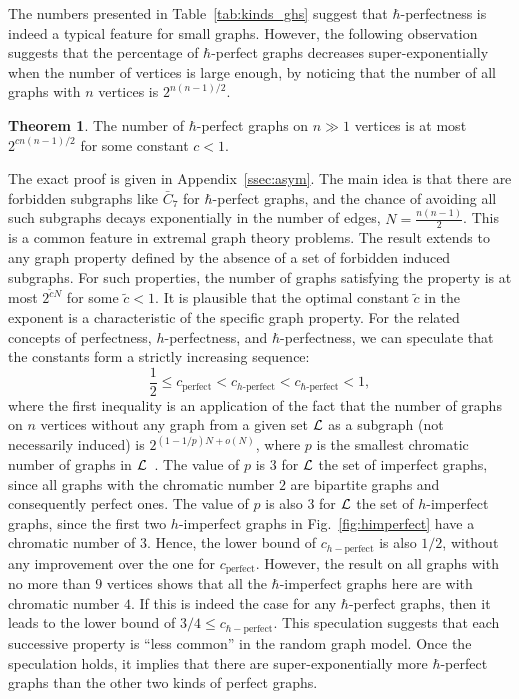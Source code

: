 \documentclass[
12pt,
prx,
aps,
reprint,
a4paper,
longbibliograph,
nofootinbib,
nobibnotes,
superscriptaddress
]{revtex4-2}
\theoremstyle{definition}
\newtheorem{theorem}{Theorem}
\begin{document}
The numbers presented in Table~\ref{tab:kinds_ghs} suggest that $\hbar$-perfectness is indeed a typical feature for small graphs. 
However, the following observation suggests that the percentage of $\hbar$-perfect graphs decreases super-exponentially when the number of vertices is large enough, by noticing that the number of all graphs with $n$ vertices is $2^{n(n-1)/2}$. 
\begin{theorem}
\label{thm:haufigkeit}
	The number of $\hbar$-perfect graphs on $n\gg 1$ vertices is at most $2^{c n(n-1)/2}$ for some constant $c<1$.
\end{theorem}
The exact proof is given in Appendix~\ref{ssec:asym}. The main idea is that there are forbidden subgraphs like $\bar{C}_7$ for $\hbar$-perfect graphs, and the chance of avoiding all such subgraphs decays exponentially in the number of edges, $N=\frac{n(n-1)}{2}$.
This is a common feature in extremal graph theory problems. 
The result extends to any graph property defined by the absence of a set of forbidden induced subgraphs. For such properties, the number of graphs satisfying the property is at most $2^{\tilde{c} N}$ for some $\tilde{c}<1$.
It is plausible that the optimal constant $\tilde{c}$ in the exponent is a characteristic of the specific graph property. For the related concepts of perfectness, $h$-perfectness, and $\hbar$-perfectness, we can speculate that the constants form a strictly increasing sequence:
\begin{equation}
\frac{1}{2} \le c_{\text{perfect}} < c_{h\text{-perfect}} < c_{\hbar\text{-perfect}} < 1,
\end{equation}
where the first inequality is an application of the fact that the number of graphs on $n$ vertices without any graph from a given set ${\cal L}$ as a subgraph (not necessarily induced) is $2^{(1-1/p)N + o(N)}$, where $p$ is the smallest chromatic number of graphs in ${\cal L}$~\cite{Erds1986TheAN,Balogh2004TheNO}.
The value of $p$ is $3$ for ${\cal L}$ the set of imperfect graphs, since all graphs with the chromatic number $2$ are bipartite graphs and consequently perfect ones.
The value of $p$ is also $3$ for ${\cal L}$ the set of $h$-imperfect graphs, since the first two $h$-imperfect graphs in Fig.~\ref{fig:himperfect} have a chromatic number of $3$. Hence, the lower bound of $c_{h-\text{perfect}}$ is also $1/2$, without any improvement over the one for $c_{\text{perfect}}$.
However, the result on all graphs with no more than $9$ vertices shows that all the $\hbar$-imperfect graphs here are with chromatic number $4$. If this is indeed the case for any $\hbar$-perfect graphs, then it leads to the lower bound of $3/4 \le c_{\hbar-\text{perfect}}$.
This speculation suggests that each successive property is ``less common'' in the random graph model.
Once the speculation holds, it implies that there are super-exponentially more $\hbar$-perfect graphs than the other two kinds of perfect graphs.
\end{document}
